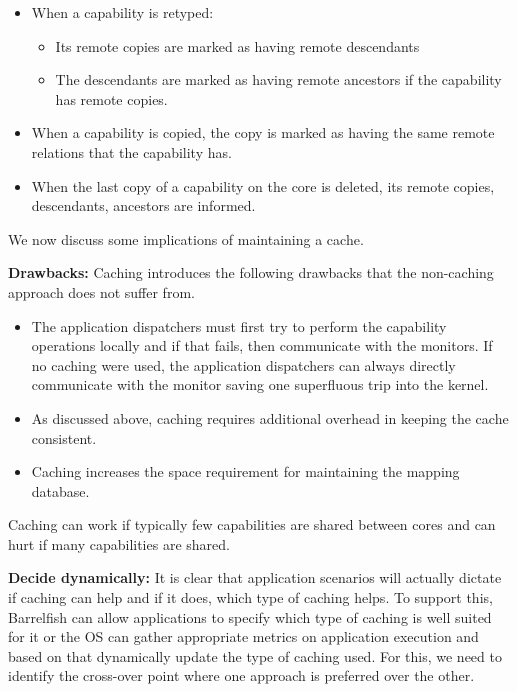 \documentclass[a4paper,twoside]{report} %
\begin{document}
\begin{itemize}
\item When a capability is retyped:
  \begin{itemize}
  \item Its remote copies are marked as having remote descendants
  \item The descendants are marked as having remote ancestors if the
    capability has remote copies.
  \end{itemize}

\item When a capability is copied, the copy is marked as having the
  same remote relations that the capability has.

\item When the last copy of a capability on the core is deleted, its
  remote copies, descendants, ancestors are informed.
\end{itemize}

We now discuss some implications of maintaining a cache.

\textbf{Drawbacks:} Caching introduces the following drawbacks that
the non-caching approach does not suffer from.

\begin{itemize}
\item The application dispatchers must first try to perform the
  capability operations locally and if that fails, then communicate
  with the monitors. If no caching were used, the application
  dispatchers can always directly communicate with the monitor saving
  one superfluous trip into the kernel.

\item As discussed above, caching requires additional overhead in
  keeping the cache consistent.

\item Caching increases the space requirement for maintaining the
  mapping database.
\end{itemize}

Caching can work if typically few capabilities are shared between
cores and can hurt if many capabilities are shared.

\textbf{Decide dynamically:} It is clear that application scenarios
will actually dictate if caching can help and if it does, which type
of caching helps. To support this, Barrelfish can allow applications
to specify which type of caching is well suited for it or the OS can
gather appropriate metrics on application execution and based on that
dynamically update the type of caching used.  For this, we need to
identify the cross-over point where one approach is preferred over the
other.
\end{document}
